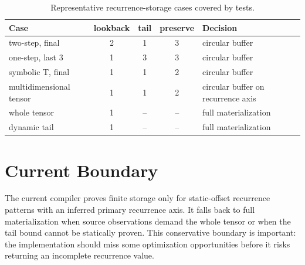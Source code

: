 \begin{table}[htbp]
\centering
\caption{Representative recurrence-storage cases covered by tests.}
\label{tab:storage-checks}
\renewcommand{\arraystretch}{1.06}
\begin{tabular}{@{}lcccl@{}}
\toprule
Case & lookback & tail & preserve & Decision \\
\midrule
two-step, final & 2 & 1 & 3 & circular buffer \\
one-step, last 3 & 1 & 3 & 3 & circular buffer \\
symbolic T, final & 1 & 1 & 2 & circular buffer \\
multidimensional tensor & 1 & 1 & 2 & circular buffer on recurrence axis \\
whole tensor & 1 & -- & -- & full materialization \\
dynamic tail & 1 & -- & -- & full materialization \\
\bottomrule
\end{tabular}
\end{table}

\section{Current Boundary}

The current compiler proves finite storage only for static-offset recurrence
patterns with an inferred primary recurrence axis. It falls back to full
materialization when source observations demand the whole tensor or when the
tail bound cannot be statically proven. This conservative boundary is important:
the implementation should miss some optimization opportunities before it risks
returning an incomplete recurrence value.
